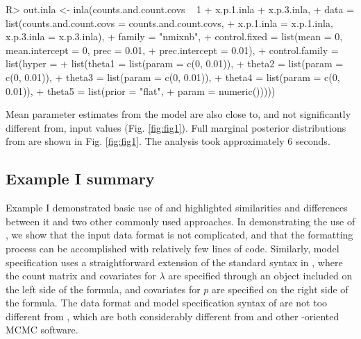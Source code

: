 \documentclass[article]{jss}
\begin{document}
\begin{Code}
R> out.inla <- inla(counts.and.count.covs ~ 1 + x.p.1.inla + x.p.3.inla,
+           data = list(counts.and.count.covs = counts.and.count.covs,
+                       x.p.1.inla = x.p.1.inla, x.p.3.inla = x.p.3.inla),
+           family = "nmixnb",
+           control.fixed = list(mean = 0, mean.intercept = 0, prec = 0.01,
+                                prec.intercept = 0.01),
+           control.family = list(hyper = 
+                                  list(theta1 = list(param = c(0, 0.01)),
+                                       theta2 = list(param = c(0, 0.01)),
+                                       theta3 = list(param = c(0, 0.01)),
+                                       theta4 = list(param = c(0, 0.01)),
+                                       theta5 = list(prior = "flat",
+                                                     param = numeric()))))
\end{Code}

Mean parameter estimates from the  model are also close to, and not significantly different from, input values (Fig. \ref{fig:fig1}). Full marginal posterior distributions from  are shown in Fig. \ref{fig:fig1}. The analysis took approximately 6 seconds.

\subsection[Example I summary]{Example I summary}
Example I demonstrated basic use of  and highlighted similarities and differences between it and two other commonly used approaches. In demonstrating the use of , we show that the input data format is not complicated, and that the formatting process can be accomplished with relatively few lines of code. Similarly, model specification uses a straightforward extension of the standard syntax in , where the count matrix and covariates for $\lambda$ are specified through an  object included on the left side of the formula, and covariates for $p$ are specified on the right side of the formula. The data format and model specification syntax of  are not too different from , which are both considerably different from  and other -oriented MCMC software.
\end{document}
